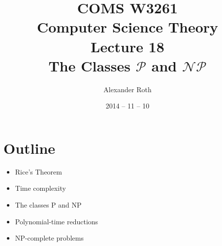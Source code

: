 \documentclass[]{article}
\begin{document}
\newcommand*{\xml}[1]{\texttt{<#1>}}
\theoremstyle{definition}
\newtheorem{thm}{Theorem}
\title{COMS W3261 \\ Computer Science Theory \\ Lecture 18 \\ The Classes
$\mathcal{P}$ and $\mathcal{NP}$}
\author{Alexander Roth}
\date{2014 -- 11 -- 10}

\maketitle

\section*{Outline}
\begin{itemize}
\item Rice's Theorem
\item Time complexity
\item The classes P and NP
\item Polynomial-time reductions
\item NP-complete problems
\end{itemize}
\end{document}
